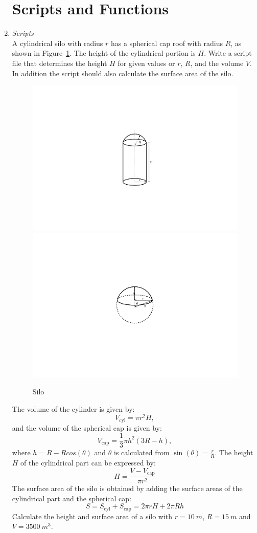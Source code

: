 \begin{enumerate}
\section{Scripts and Functions} \label{sect:scripts_functions}
\item \textit{Scripts}\\
A cylindrical silo with radius $r$ has a spherical cap roof with radius $R$, as shown in Figure~\ref{fig:silo}. The height of the cylindrical portion is $H$. Write a script file that determines the height $H$ for given values or $r$, $R$, and the volume $V$. In addition the script should also calculate the surface area of the silo.
\begin{figure}[h]
	\myfloatalign
	\includegraphics[width=0.35\linewidth]{Graphics/Additional-Ex/silo}\quad
	\includegraphics[width=0.35\linewidth]{Graphics/Additional-Ex/silo-cap}
	\caption{Silo}
	\label{fig:silo}
\end{figure}
The volume of the cylinder is given by:
\begin{equation*}
V_{\textrm{cyl}} = \pi r^2 H,
\end{equation*}
and the volume of the spherical cap is given by:
\begin{equation*}
V_{\textrm{cap}} = \frac{1}{3}\pi h^2 (3R-h),
\end{equation*}
where $h=R-Rcos(\theta)$ and $\theta$ is calculated from $\sin(\theta) = \frac{r}{R}$. The height $H$ of the cylindrical part can be expressed by:
\begin{equation*}
H = \frac{V-V_{\textrm{cap}}}{\pi r^2}
\end{equation*}
The surface area of the silo is obtained by adding the surface areas of the cylindrical part and the spherical cap:
\begin{equation*}
S = S_{\textrm{cyl}} + S_{\textrm{cap}} = 2\pi rH + 2\pi Rh
\end{equation*}
Calculate the height and surface area of a silo with $r=10~m$, $R=15~m$ and $V=3500~m^3$. 


\end{enumerate}
